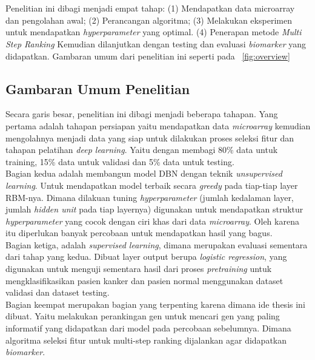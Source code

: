 \chapter{\babTiga}

Penelitian ini dibagi menjadi empat tahap: (1) Mendapatkan data microarray dan pengolahan awal; (2) Perancangan algoritma; (3) Melakukan eksperimen untuk mendapatkan \textit{hyperparameter} yang optimal. (4) Penerapan metode \textit{Multi Step Ranking} Kemudian dilanjutkan dengan  testing dan evaluasi \textit{biomarker} yang didapatkan. Gambaran umum dari penelitian ini seperti pada \pic~\ref{fig:overview}




\section{Gambaran Umum Penelitian}

Secara garis besar, penelitian ini dibagi menjadi beberapa tahapan. Yang pertama adalah tahapan persiapan yaitu mendapatkan data \textit{microarray} kemudian mengolahnya menjadi data yang siap untuk dilakukan proses seleksi fitur dan tahapan pelatihan \textit{deep learning}. Yaitu dengan membagi 80\% data untuk training, 15\% data untuk  validasi dan 5\% data untuk testing.\\
Bagian kedua adalah  membangun model DBN dengan teknik \textit{unsupervised learning}. Untuk mendapatkan model terbaik   secara \textit{greedy} pada tiap-tiap layer RBM-nya. Dimana dilakuan tuning \textit{hyperparameter} (jumlah kedalaman layer, jumlah \textit{hidden unit} pada tiap layernya) digunakan untuk mendapatkan struktur \textit{hyperparameter} yang cocok dengan ciri khas dari data \textit{microarray}. Oleh karena itu diperlukan banyak percobaan untuk mendapatkan hasil yang bagus. \\
Bagian ketiga, adalah \textit{supervised learning}, dimana merupakan  evaluasi sementara dari tahap yang kedua. Dibuat layer output berupa \textit{logistic regression}, yang digunakan untuk menguji sementara hasil dari proses \textit{pretraining} untuk mengklasifikasikan pasien kanker dan pasien normal menggunakan dataset validasi dan dataset testing. \\
Bagian keempat merupakan bagian yang terpenting karena  dimana ide thesis ini dibuat. Yaitu melakukan perankingan gen untuk mencari gen yang paling informatif yang didapatkan dari model pada percobaan sebelumnya. Dimana algoritma seleksi fitur untuk multi-step ranking dijalankan agar didapatkan \textit{biomarker}.\\

